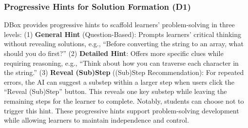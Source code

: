 

\subsubsection{Progressive Hints for Solution Formation (D1)}

DBox provides progressive hints to scaffold learners' problem-solving in three levels: (1) \textbf{General Hint} (Question-Based): Prompts learners' critical thinking without revealing solutions, e.g., ``Before converting the string to an array, what should you do first?'' (2) \textbf{Detailed Hint}: Offers more specific clues while requiring reasoning, e.g., ``Think about how you can traverse each character in the string.'' (3) \textbf{Reveal (Sub)Step} ((Sub)Step Recommendation): For repeated errors, the AI can suggest a substep within a larger step when users click the ``Reveal (Sub)Step'' button. This reveals one key substep while leaving the remaining steps for the learner to complete. Notably, students can choose not to trigger this hint. These progressive hints support problem-solving development while allowing learners to maintain independence and control.

